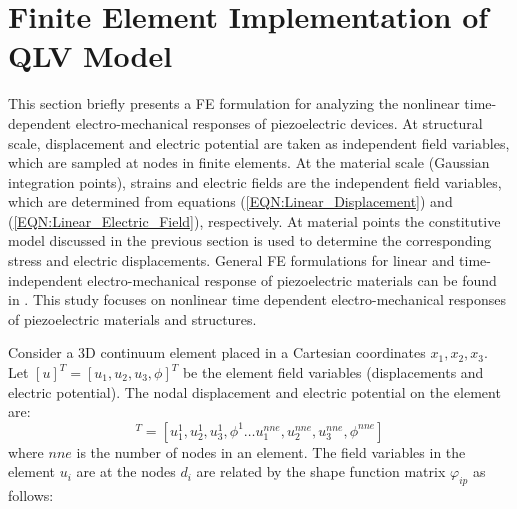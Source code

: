 \section{Finite Element Implementation of QLV Model}
\label{Chapter:Finite_element}
This section briefly presents a FE formulation for analyzing the nonlinear time-dependent electro-mechanical responses of piezoelectric devices. 
At structural scale, displacement and electric potential are taken as independent field variables, which are sampled at nodes in finite elements. 
At the material scale (Gaussian integration points), strains and electric fields are the independent field variables, which are determined from equations (\ref{EQN:Linear_Displacement}) and (\ref{EQN:Linear_Electric_Field}), respectively.
At material points the constitutive model discussed in the previous section is used to determine the corresponding stress and electric displacements. 
General FE formulations for linear and time-independent electro-mechanical response of piezoelectric materials can be found in \cite{Benjeddou2000}.
This study focuses on nonlinear time dependent electro-mechanical responses of piezoelectric materials and structures. 

Consider a 3D continuum element placed in a Cartesian coordinates $x_1, x_2, x_3$. 
Let $[u]^T=[u_1,u_2,u_3,\phi]^T$ be the element field variables (displacements and electric potential). 
The nodal displacement and electric potential on the element are:
\begin{equation}
[d]^T=[u_1^1,u_2^1,u_3^1,\phi^1 \dots u_1^{nne},u_2^{nne},u_3^{nne},\phi^{nne}]
\label{EQN:dof_vector_structure}
\end{equation}
where $nne$ is the number of nodes in an element.
The field variables in the element $u_i$ are at the nodes $d_i$ are related by the shape function matrix $\varphi_{ip}$ as follows:


